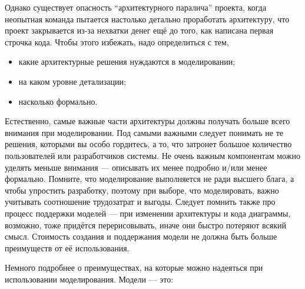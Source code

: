 \documentclass[a5paper]{article}
\begin{document}
Однако существует опасность ``архитектурного паралича'' проекта, когда неопытная команда пытается настолько детально проработать архитектуру, что проект закрывается из-за нехватки денег ещё до того, как написана первая строчка кода. Чтобы этого избежать, надо определиться с тем,

\begin{itemize}
	\item какие архитектурные решения нуждаются в моделировании;
	\item на каком уровне детализации;
	\item насколько формально.
\end{itemize}

Естественно, самые важные части архитектуры должны получать больше всего внимания при моделировании. Под самыми важными следует понимать не те решения, которыми вы особо гордитесь, а то, что затронет большое количество пользователей или разработчиков системы. Не очень важным компонентам можно уделять меньше внимания --- описывать их менее подробно и/или менее формально. Помните, что моделирование выполняется не ради высшего блага, а чтобы упростить разработку, поэтому при выборе, что моделировать, важно учитывать соотношение трудозатрат и выгоды. Следует помнить также про процесс поддержки моделей --- при изменении архитектуры и кода диаграммы, возможно, тоже придётся перерисовывать, иначе они быстро потеряют всякий смысл. Стоимость создания и поддержания модели не должна быть больше преимуществ от её использования.

Немного подробнее о преимуществах, на которые можно надеяться при использовании моделирования. Модели --- это:
\end{document}
